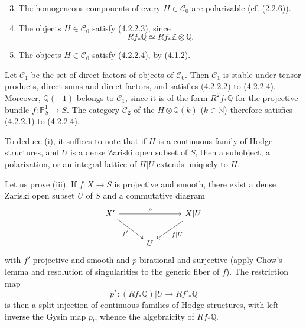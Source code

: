 \documentclass[10pt]{article}
\newcommand{\Q}{\mathbb Q}
\newcommand{\Z}{\mathbb Z}
\newcommand{\N}{\mathbb N}
\newcommand{\bbP}{\mathbb P}
\begin{document}
\begin{enumerate}[label=\alph*)]
\setcounter{enumi}{2}
\item The homogeneous components of every $H\in\mathcal C_0$ are polarizable (cf. (2.2.6)).
\item The objects $H\in\mathcal C_0$ satisfy (4.2.2.3), since
\[
Rf_*\Q\simeq Rf_*\Z\otimes\Q.
\]
\item The objects $H\in\mathcal C_0$ satisfy (4.2.2.4), by (4.1.2).
\end{enumerate}
Let $\mathcal C_1$ be the set of direct factors of objects of $\mathcal C_0$. Then $\mathcal C_1$ is stable under tensor products, direct sums and direct factors, and satisfies (4.2.2.2) to (4.2.2.4). Moreover, $\Q(-1)$ belongs to $\mathcal C_1$, since it is of the form $R^2f_*\Q$ for the projective bundle $f:\bbP^1_S\to S$. The category $\mathcal C_2$ of the $H\otimes\Q(k)$ ($k\in\N$) therefore satisfies (4.2.2.1) to (4.2.2.4).

To deduce (i), it suffices to note that if $H$ is a continuous family of Hodge structures, and $U$ is a dense Zariski open subset of $S$, then a subobject, a polarization, or an integral lattice of $H|U$ extends uniquely to $H$.

Let us prove (iii). If $f:X\to S$ is projective and smooth, there exist a dense Zariski open subset $U$ of $S$ and a commutative diagram
\[
\begin{tikzcd}[column sep=3em,row sep=2em]
X' \arrow[rr,"p"] \arrow[dr,"f'"'] && X|U \arrow[dl,"f|U"]\\
& U &
\end{tikzcd}
\]
with $f'$ projective and smooth and $p$ birational and surjective (apply Chow's lemma and resolution of singularities to the generic fiber of $f$). The restriction map
\[
p^*:(Rf_*\Q)|U\longrightarrow Rf'_*\Q
\]
is then a split injection of continuous families of Hodge structures, with left inverse the Gysin map $p_!$, whence the algebraicity of $Rf_*\Q$.

\begingroup
\renewcommand{\thefootnote}{(\arabic{footnote})}
\end{document}
